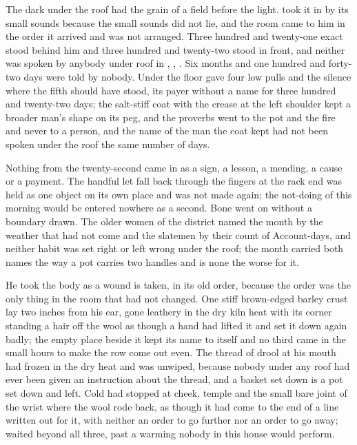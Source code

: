 
The dark under the roof had the grain of a field before the light.  took it in by its small sounds because the small sounds did not lie, and the room came to him in the order it arrived and was not arranged. Three hundred and twenty-one exact stood behind him and three hundred and twenty-two stood in front, and neither was spoken by anybody under  roof in , , . Six months and one hundred and forty-two days were told by nobody. Under the floor  gave four low pulls and the silence where the fifth should have stood, its payer without a name for three hundred and twenty-two days; the salt-stiff coat with the crease at the left shoulder kept a broader man's shape on its peg, and the proverbs went to the pot and the fire and never to a person, and the name of the man the coat kept had not been spoken under the roof the same number of days.

Nothing from the twenty-second came in as a sign, a lesson, a mending, a cause or a payment. The handful let fall back through the fingers at the rack end was held as one object on its own place and was not made again; the not-doing of this morning would be entered nowhere as a second. Bone went on without a boundary drawn. The older women of the district named the month by the weather that had not come and the slatemen by their count of Account-days, and neither habit was set right or left wrong under the roof; the month carried both names the way a pot carries two handles and is none the worse for it.

He took the body as a wound is taken, in its old order, because the order was the only thing in the room that had not changed. One stiff brown-edged barley crust lay two inches from his ear, gone leathery in the dry kiln heat with its corner standing a hair off the wool as though a hand had lifted it and set it down again badly; the empty place beside it kept its name to itself and no third came in the small hours to make the row come out even. The thread of drool at his mouth had frozen in the dry heat and was unwiped, because nobody under any roof had ever been given an instruction about the thread, and a basket set down is a pot set down and left. Cold had stopped at cheek, temple and the small bare joint of the wrist where the wool rode back, as though it had come to the end of a line written out for it, with neither an order to go further nor an order to go away;  waited beyond all three, past a warming nobody in this house would perform.

